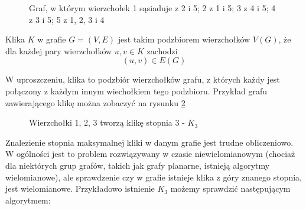   \begin{figure}[H]
    \centering
    \caption{Graf, w którym wierzchołek 1 sąsiaduje z 2 i 5; 2 z 1 i 5; 3 z 4 i 5; 4 z 3 i 5; 5 z 1, 2, 3 i 4 }
    \label{sasie}
  \end{figure}

   \begin{definition}[Klika]
    Klika $K$ w grafie $G=(V,E)$ jest takim podzbiorem wierzchołków $V(G)$, że dla każdej pary wierzchołków $u, v \in K$ zachodzi $$(u, v) \in E(G)$$ 
   \end{definition}
   
   W uproszczeniu, klika to podzbiór wierzchołków grafu, z których każdy jest połączony z każdym innym wiechołkiem tego podzbioru. Przykład grafu zawierającego klikę można zobaczyć na rysunku \ref{klik}
   \begin{figure}[H]
   \centering
     \caption{Wierzchołki 1, 2, 3 tworzą klikę stopnia 3 - $K_3$ }
     \label{klik}
  \end{figure}

  Znalezienie stopnia maksymalnej kliki w danym grafie jest trudne obliczeniowo.
  W ogólności jest to problem rozwiązywany w czasie niewielomianowym (chociaż dla niektórych grup grafów, 
  takich jak grafy planarne, istnieją algorytmy wielomianowe), ale sprawdzenie czy w grafie istnieje klika
  z góry znanego stopnia, jest wielomianowe. Przykładowo istnienie $K_3$ możemy sprawdzić następującym algorytmem:
  
